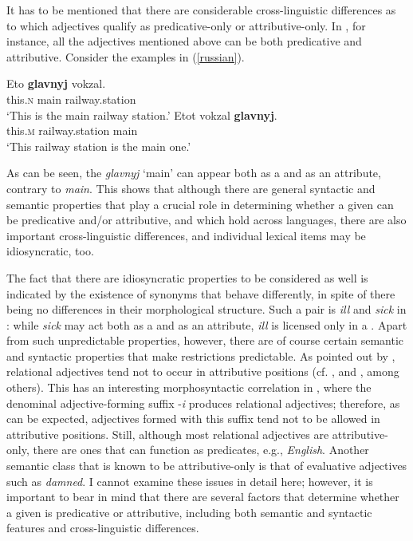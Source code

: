 It has to be mentioned that there are considerable cross-linguistic differences as to which adjectives qualify as predicative-only or attributive-only. In , for instance, all the adjectives mentioned above can be both predicative and attributive. Consider the examples in (\ref{russian}).

\ea \label{russian}
\ea	\gll Eto \textbf{glavnyj} vokzal.\\
this.\textsc{n} main railway.station\\
\glt `This is the main railway station.'
\ex \gll Etot vokzal	\textbf{glavnyj}.\\
this.\textsc{m} railway.station main\\
\glt `This railway station is the main one.'
\z
\z

As can be seen, the  \textit{glavnyj} `main' can appear both as a  and as an attribute, contrary to  \textit{main}. This shows that although there are general syntactic and semantic properties that play a crucial role in determining whether a given  can be predicative and/or attributive, and which hold across languages, there are also important cross-linguistic differences, and individual lexical items may be idiosyncratic, too.

The fact that there are idiosyncratic properties to be considered as well is indicated by the existence of synonyms that behave differently, in spite of there being no differences in their morphological structure. Such a pair is \textit{ill} and \textit{sick} in : while \textit{sick} may act both as a  and as an attribute, \textit{ill} is licensed only in a . Apart from such unpredictable properties, however, there are of course certain semantic and syntactic properties that make restrictions predictable. As pointed out by \citet{kenesei2014}, relational adjectives tend not to occur in attributive positions (cf. \citealt{bally1944}, \citealt{mcnallyboleda2004} and \citealt{fradin2007}, among others). This has an interesting morphosyntactic correlation in , where the denominal adjective-forming suffix -\textit{i} produces relational adjectives; therefore, as can be expected, adjectives formed with this suffix tend not to be allowed in attributive positions. Still, although most relational adjectives are attributive-only, there are ones that can function as predicates, e.g., \textit{English}. Another semantic class that is known to be attributive-only is that of evaluative adjectives such as \textit{damned}. I cannot examine these issues in detail here; however, it is important to bear in mind that there are several factors that determine whether a given  is predicative or attributive, including both semantic and syntactic features and cross-linguistic differences.

